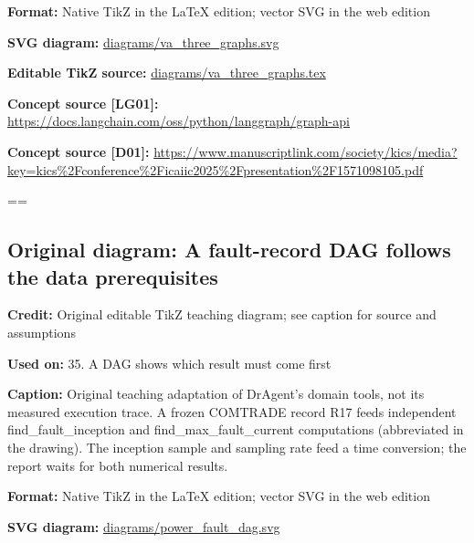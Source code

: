 \documentclass[10pt,letterpaper]{article}
\begin{document}
\textbf{Format:} Native TikZ in the LaTeX edition; vector SVG in the web edition\par
\textbf{SVG diagram:} \href{diagrams/va_three_graphs.svg}{\small\ttfamily diagrams/\allowbreak{}va\_\allowbreak{}three\_\allowbreak{}graphs.\allowbreak{}svg}\par
\textbf{Editable TikZ source:} \href{diagrams/va_three_graphs.tex}{\small\ttfamily diagrams/\allowbreak{}va\_\allowbreak{}three\_\allowbreak{}graphs.\allowbreak{}tex}\par
\textbf{Concept source [LG01]:} \href{https://docs.langchain.com/oss/python/langgraph/graph-api}{\small\ttfamily https:/\allowbreak{}/\allowbreak{}docs.\allowbreak{}langchain.\allowbreak{}com/\allowbreak{}oss/\allowbreak{}python/\allowbreak{}langgraph/\allowbreak{}graph-\allowbreak{}api}\par
\textbf{Concept source [D01]:} \href{https://www.manuscriptlink.com/society/kics/media?key=kics\%2Fconference\%2Ficaiic2025\%2Fpresentation\%2F1571098105.pdf}{\small\ttfamily https:/\allowbreak{}/\allowbreak{}www.\allowbreak{}manuscriptlink.\allowbreak{}com/\allowbreak{}society/\allowbreak{}kics/\allowbreak{}media?\allowbreak{}key=\allowbreak{}kics\%\allowbreak{}2Fconference\%\allowbreak{}2Ficaiic2025\%\allowbreak{}2Fpresentation\%\allowbreak{}2F1571098105.\allowbreak{}pdf}\par
\egroup\par\noindent\box\readingEntry\par\medskip
\setbox\readingEntry=\vbox\bgroup\hsize=\linewidth\subsection*{Original diagram: A fault-record DAG follows the data prerequisites}
\textbf{Credit:} Original editable TikZ teaching diagram; see caption for source and assumptions\par
\textbf{Used on:} 35. A DAG shows which result must come first\par
\textbf{Caption:} Original teaching adaptation of DrAgent's domain tools, not its measured execution trace. A frozen COMTRADE record R17 feeds independent find\_fault\_inception and find\_max\_fault\_current computations (abbreviated in the drawing). The inception sample and sampling rate feed a time conversion; the report waits for both numerical results.\par
\textbf{Format:} Native TikZ in the LaTeX edition; vector SVG in the web edition\par
\textbf{SVG diagram:} \href{diagrams/power_fault_dag.svg}{\small\ttfamily diagrams/\allowbreak{}power\_\allowbreak{}fault\_\allowbreak{}dag.\allowbreak{}svg}\par
\end{document}
